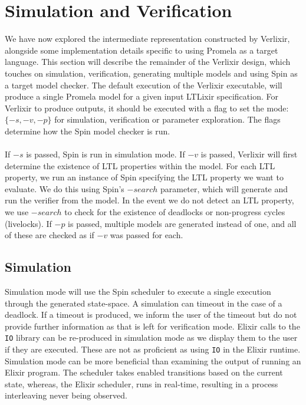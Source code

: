 \section{Simulation and Verification} \label{sec:simulation_verification}
We have now explored the intermediate representation constructed by Verlixir, alongside some implementation details specific to using Promela as a target language. This section will describe the remainder of the Verlixir design, which touches on simulation, verification, generating multiple models and using Spin as a target model checker. The default execution of the Verlixir executable, will produce a single Promela model for a given input LTLixir specification. For Verlixir to produce outputs, it should be executed with a flag to set the mode: $\{-s, -v, -p\}$ for simulation, verification or parameter exploration. The flags determine how the Spin model checker is run.
\\ \\
If $-s$ is passed, Spin is run in simulation mode. If $-v$ is passed, Verlixir will first determine the existence of LTL properties within the model. For each LTL property, we run an instance of Spin specifying the LTL property we want to evaluate. We do this using Spin's $-search$ parameter, which will generate and run the verifier from the model. In the event we do not detect an LTL property, we use $-search$ to check for the existence of deadlocks or non-progress cycles (livelocks). If $-p$ is passed, multiple models are generated instead of one, and all of these are checked as if $-v$ was passed for each.
\subsection{Simulation}
Simulation mode will use the Spin scheduler to execute a single execution through the generated state-space. A simulation can timeout in the case of a deadlock. If a timeout is produced, we inform the user of the timeout but do not provide further information as that is left for verification mode. Elixir calls to the \texttt{IO} library can be re-produced in simulation mode as we display them to the user if they are executed. These are not as proficient as using \texttt{IO} in the Elixir runtime. Simulation mode can be more beneficial than examining the output of running an Elixir program. The scheduler takes enabled transitions based on the current state, whereas, the Elixir scheduler, runs in real-time, resulting in a process interleaving never being observed.
